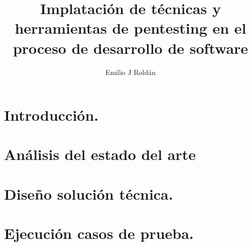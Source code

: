 \documentclass[12pt,a4paper]{report}
\title{Implatación de técnicas y herramientas de pentesting en el proceso de desarrollo de software}
\author{Emilio J Roldán}
\begin{document}
\maketitle
\tableofcontents


\newpage

\chapter{Introducción.}


\chapter{Análisis del estado del arte}
 
 
\chapter{Diseño solución técnica.}


\chapter{Ejecución casos de prueba.}


\newpage
{}
\printbibliography[title=Bibliografia]
\newpage
\printglossaries
\end{document}
